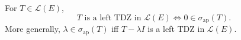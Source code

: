 For $T \in \mathcal{L}(E)$,
$$T \text{ is a left TDZ in } \mathcal{L}(E) \iff 0 \in \sigma_{\text{ap}}(T).$$
More generally, $\lambda \in \sigma_{\text{ap}}(T)$ iff $T - \lambda I$ is a left TDZ in $\mathcal{L}(E)$.

